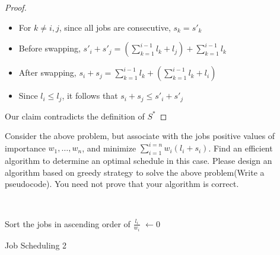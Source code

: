\begin{exercise}[]
\begin{proof}
    \begin{itemize}
      \item For $k \neq i,j$, since all jobs are consecutive, $s_k = s'_k$
      \item Before swapping, $s'_i + s'_j = \left(\sum_{k=1}^{i-1} l_k + l_j \right) + \sum_{k=1}^{i-1} l_k$
      \item After swapping, $s_i + s_j = \sum_{k=1}^{i-1} l_k + \left(\sum_{k=1}^{i-1} l_k + l_i \right)$
      \item Since $l_i \le l_j$, it follows that $s_i + s_j \le s'_i + s'_j $
    \end{itemize}

    Our claim contradicts the definition of $S^{*}$

  \end{proof}

Consider the above problem, but associate with the jobs positive values of importance $w_1,…,w_n$, and minimize $\sum_{i=1}^{i=n} w_i(l_i+s_i)$. Find an efficient algorithm to determine an optimal schedule in this case. Please design an algorithm based on greedy strategy to solve the above problem(Write a pseudocode). You need not prove that your algorithm is correct.
  \begin{solution}

  \par{~}

  \begin{algorithm}[H]
     
    \BlankLine
    Sort the jobs in ascending order of $\frac{l_i}{w_i}$\;
    \Time $\leftarrow 0$ \;
    \caption{Job Scheduling 2 \label{js2}}
  \end{algorithm}
  \end{solution}

  \label{ex1}
\end{exercise}



